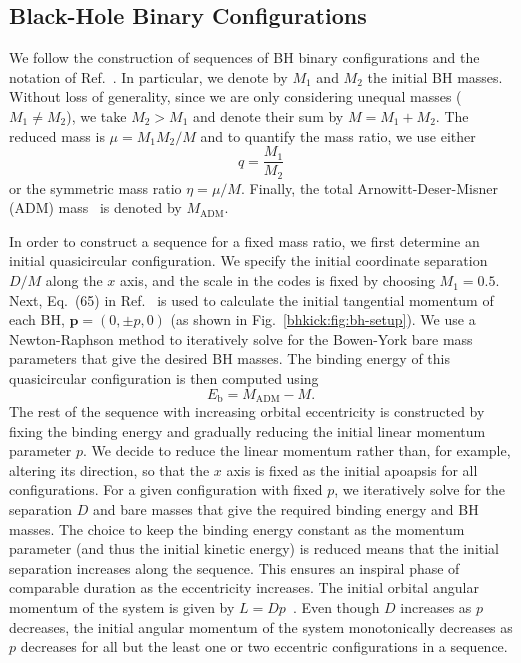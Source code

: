 \subsection{Black-Hole Binary Configurations}
%
\label{bhkick:sec:configs}
%
We follow the construction of sequences of BH binary configurations
and the notation of Ref.~\cite{Sperhake:2007gu}. In particular, we 
denote by $M_1$ 
and $M_2$ the initial BH masses. Without loss of generality, since 
we are only considering unequal masses ($M_1 \neq M_2$), we take $M_2 > M_1$
and denote their sum by $M = M_1 + M_2$. The reduced mass is 
$\mu = M_1 M_2 /M$ and to quantify the mass ratio, we use either
\begin{equation}
    q = \frac{M_1}{M_2}
    \label{bhkick:eq:mass-ratio}
\end{equation}
or the symmetric mass ratio $\eta = \mu/M$. Finally, the 
total Arnowitt-Deser-Misner (ADM) mass~\cite{Arnowitt:1962hi} is denoted by 
$M_{\mathrm{ADM}}$.


In order to construct a sequence for a fixed mass ratio, we first 
determine an initial quasicircular configuration. We specify the initial
coordinate separation $D/M$ along the $x$ axis, and the scale in the codes 
is fixed by choosing $M_1=0.5$. Next, Eq.~(65) in 
Ref.~\cite{Brugmann:2008zz} is used to calculate the initial tangential 
momentum of each BH, $\mathbf{p}=(0,\pm p,0)$ (as shown in 
Fig.~\ref{bhkick:fig:bh-setup}). We use a 
Newton-Raphson method to iteratively solve for the Bowen-York bare mass 
parameters that give the desired BH masses. The binding energy 
of this quasicircular configuration is then computed using
\begin{equation}
    E_{\mathrm{b}}=M_{\mathrm{ADM}}-M.\label{bhkick:eq:binding-energy}
\end{equation}
The rest of the sequence with increasing orbital eccentricity is 
constructed by fixing the binding energy and gradually reducing the initial
linear momentum parameter $p$.
We decide to reduce the linear momentum rather than, for example, 
altering its direction,
so that the $x$ axis is fixed as the initial apoapsis for all configurations.
For a given configuration with fixed $p$, we 
iteratively solve for the separation $D$ and bare masses that give the 
required binding energy and BH masses. The choice to keep the 
binding energy constant as the momentum parameter (and thus the initial 
kinetic energy) is reduced means that the initial separation increases along 
the sequence. This ensures an inspiral phase of comparable duration as the 
eccentricity increases.
The initial orbital angular momentum of the system 
is given by $L=Dp$~\cite{York:1989jn}. Even though $D$ increases as $p$ 
decreases, the initial angular momentum of the system monotonically decreases 
as $p$ decreases for all but the least one or two eccentric configurations 
in a sequence.


